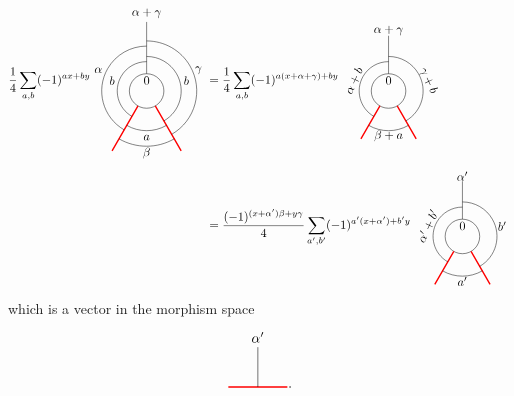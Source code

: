	\begin{align}
	\frac{1}{4}
	\sum_{a,b}(-1)^{ax+by}
	\begin{tikzpicture}[scale=1,baseline=(current bounding box.center)]
	\draw (0,0) circle (0.5cm);
	\draw[red,line width=0.4mm]
	\foreach \a in {-60, -120} {
		(\a:0.5) -- (\a:2)
	};
	\draw[] (90:0.5) -- (90:2);
	\draw ([shift=(-60:1cm)]0,0) arc (-60:90:1cm);
	\draw ([shift=(-120:1.15cm)]0,0) arc (-120:-60:1.15cm);
	\draw ([shift=(240:0.85cm)]0,0) arc (240:90:0.85cm);
	\draw ([shift=(240:1.3cm)]0,0) arc (240:90:1.3cm);
	\draw ([shift=(-60:1.45cm)]0,0) arc (-60:90:1.45cm);
	\draw ([shift=(-120:1.6cm)]0,0) arc (-120:-60:1.6cm);
	\node at (90:.3cm){$0$};\node at (90:2.25cm){$\alpha+\gamma$};
	\node at (-1,0.3) {$b$};
	\node at (1.15,0.3) {$b$};
	\node at (0,-1.35) {$a$};
	\node at (-1.4,0.6) {$\alpha$};
	\node at (1.5,0.6) {$\gamma$};
	\node at (0,-1.8) {$\beta$};
	\end{tikzpicture}
	&=
	\frac{1}{4}
	\sum_{a,b}(-1)^{a(x+\alpha+\gamma)+by}
	\begin{tikzpicture}[scale=1,baseline=(current bounding box.center)]
	\draw (0,0) circle (0.5cm);
	\draw[red,line width=0.4mm]
	\foreach \a in {-60, -120} {
		(\a:0.5) -- (\a:1.6)
	};
	\draw ([shift=(-60:1cm)]0,0) arc (-60:90:1cm);
	\draw ([shift=(-120:1.15cm)]0,0) arc (-120:-60:1.15cm);
	\draw ([shift=(240:0.85cm)]0,0) arc (240:90:0.85cm);
	\draw[] (90:0.5) -- (90:1.6);
	\node at (90:.3cm){$0$};\node at (90:1.75cm){$\alpha+\gamma$};
	\node[rotate=65] at (-1,0.3) {$\alpha+b$};
	\node[rotate=-65] at (1.15,0.3) {$\gamma+b$};
	\node at (0,-1.3) {$\beta+a$};
	\end{tikzpicture}\\
	&=
	\frac{(-1)^{(x+\alpha^\prime)\beta+y\gamma}}{4}
	\sum_{a^\prime,b^\prime}(-1)^{a^\prime(x+\alpha^\prime)+b^\prime y}
	\begin{tikzpicture}[scale=1,baseline=(current bounding box.center)]
	\draw (0,0) circle (0.5cm);
	\draw[red,line width=0.4mm]
	\foreach \a in {-60, -120} {
		(\a:0.5) -- (\a:1.6)
	};
	\draw ([shift=(-60:1cm)]0,0) arc (-60:90:1cm);
	\draw ([shift=(-120:1.15cm)]0,0) arc (-120:-60:1.15cm);
	\draw ([shift=(240:0.85cm)]0,0) arc (240:90:0.85cm);
	\draw[] (90:0.5) -- (90:1.6);
	\node at (90:.3cm){$0$};\node at (90:1.75cm){$\alpha^\prime$};
	\node[rotate=65] at (-1,0.3) {$\alpha^\prime+b^\prime$};
	\node at (1.15,0.3) {$b^\prime$};
	\node at (0,-1.3) {$a^\prime$};
	\end{tikzpicture}
	\end{align}
which is a vector in the morphism space
	\begin{equation}	
		\begin{tikzpicture}
			\draw[red,line width=0.4mm] (0,0) -- (1.5,0);
			\draw (0.75,0) -- (0.75,1) node [pos=1.25]{$\alpha^\prime$};
		\end{tikzpicture}.
	\end{equation}
